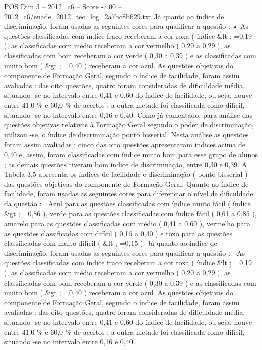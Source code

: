 \begin{textsample}{POS Dim 3 – 2012\_c6 – Score -7.00 – 2012\_c6/enade\_2012\_tec\_log\_2a7bc8b629.txt}
Já quanto ao índice de discriminação, foram usadas as seguintes cores para qualificar a questão : • As questões classificadas com índice fraco receberam a cor roxa ( índice \&lt ; =0,19 ), as classificadas com médio receberam a cor vermelho ( 0,20 a 0,29 ), as classificadas com bom receberam a cor verde ( 0,30 a 0,39 ) e as classificadas com muito bom ( \&gt ; =0,40 ) receberam a cor azul.
As questões objetivas do componente de Formação Geral, segundo o índice de facilidade, foram assim avaliadas : das oito questões, quatro foram consideradas de dificuldade média, situando -se no intervalo entre 0,41 e 0,60 do índice de facilidade, ou seja, houve entre 41,0 \% e 60,0 \% de acertos ; a outra metade foi classificada como difícil, situando -se no intervalo entre 0,16 e 0,40.
Como já comentado, para análise das questões objetivas relativas à Formação Geral segundo o poder de discriminação, utilizou -se, o índice de discriminação ponto bisserial.
Nesta análise as questões foram assim avaliadas : cinco das oito questões apresentaram índices acima de 0,40 e, assim, foram classificadas com índice muito bom para esse grupo de alunos ; as demais questões tiveram bom índice de discriminação, entre 0,30 e 0,39.
A Tabela 3.5 apresenta os índices de facilidade e discriminação ( ponto bisserial ) das questões objetivas do componente de Formação Geral.
Quanto ao índice de facilidade, foram usadas as seguintes cores para diferenciar o nível de dificuldade da questão :  Azul para as questões classificadas com índice muito fácil ( índice \&gt ; =0,86 ), verde para as questões classificadas com índice fácil ( 0,61 a 0,85 ), amarelo para as questões classificadas com médio ( 0,41 a 0,60 ), vermelho para as questões classificadas com difícil ( 0,16 a 0,40 ) e roxo para as questões classificadas com muito difícil ( \&lt ; =0,15 ).
Já quanto ao índice de discriminação, foram usadas as seguintes cores para qualificar a questão :  As questões classificadas com índice fraco receberam a cor roxa ( índice \&lt ; =0,19 ), as classificadas com médio receberam a cor vermelho ( 0,20 a 0,29 ), as classificadas com bom receberam a cor verde ( 0,30 a 0,39 ) e as classificadas com muito bom ( \&gt ; =0,40 ) receberam a cor azul.
As questões objetivas do componente de Formação Geral, segundo o índice de facilidade, foram assim avaliadas : das oito questões, quatro foram consideradas de dificuldade média, situando -se no intervalo entre 0,41 e 0,60 do índice de facilidade, ou seja, houve entre 41,0 \% e 60,0 \% de acertos ; a outra metade foi classificada como difícil, situando -se no intervalo entre 0,16 e 0,40.

\end{textsample}
